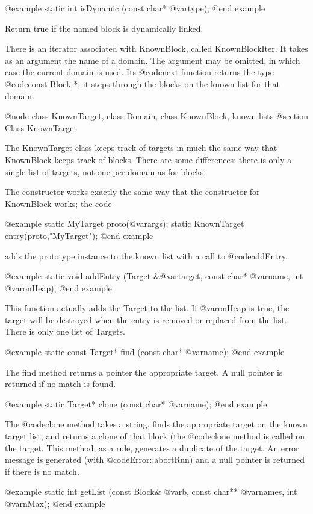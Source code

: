 @example
static int isDynamic (const char* @var{type});
@end example

Return true if the named block is dynamically linked.

There is an iterator associated with KnownBlock, called
KnownBlockIter.  It takes as an argument the name of a domain.  The
argument may be omitted, in which case the current domain is used.
Its @code{next} function returns the type @code{const Block *}; it
steps through the blocks on the known list for that domain.

@node class KnownTarget, class Domain, class KnownBlock, known lists
@section Class KnownTarget

The KnownTarget class keeps track of targets in much the same way
that KnownBlock keeps track of blocks.  There are some differences:
there is only a single list of targets, not one per domain as for
blocks.

The constructor works exactly the same way that the constructor for
KnownBlock works; the code

@example
static MyTarget proto(@var{args});
static KnownTarget entry(proto,"MyTarget");
@end example

adds the prototype instance to the known list with a call to
@code{addEntry}.

@example
static void addEntry (Target &@var{target}, const char* @var{name}, int @var{onHeap});
@end example

This function actually adds the Target to the list.  If @var{onHeap} is true,
the target will be destroyed when the entry is removed or replaced from
the list.  There is only one list of Targets.

@example
static const Target* find (const char* @var{name});
@end example

The find method returns a pointer the appropriate target.
A null pointer is returned if no match
is found.

@example
static Target* clone (const char* @var{name});
@end example

The @code{clone} method takes a string, finds the appropriate target on
the known target list, and returns a clone of that block (the
@code{clone} method is called on the target.  This method, as
a rule, generates a duplicate of the target.
An error message is generated (with @code{Error::abortRun}) and
a null pointer is returned if there is no match.

@example
static int getList (const Block& @var{b}, const char** @var{names}, int @var{nMax});
@end example

